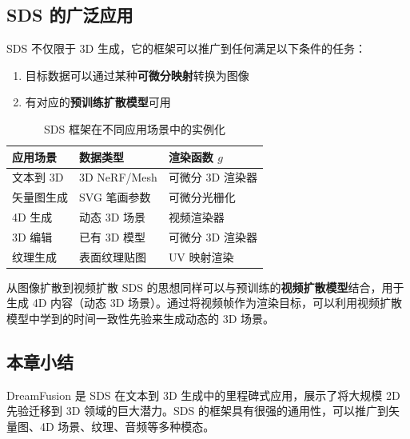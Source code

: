 \subsection{SDS 的广泛应用}

SDS 不仅限于 3D 生成，它的框架可以推广到任何满足以下条件的任务：
\begin{enumerate}
    \item 目标数据可以通过某种\textbf{可微分映射}转换为图像
    \item 有对应的\textbf{预训练扩散模型}可用
\end{enumerate}

\begin{table}[H]
\centering
\begin{tabular}{lll}
\toprule
\textbf{应用场景} & \textbf{数据类型} & \textbf{渲染函数 $g$} \\
\midrule
文本到 3D & 3D NeRF/Mesh & 可微分 3D 渲染器 \\
矢量图生成 & SVG 笔画参数 & 可微分光栅化 \\
4D 生成 & 动态 3D 场景 & 视频渲染器 \\
3D 编辑 & 已有 3D 模型 & 可微分 3D 渲染器 \\
纹理生成 & 表面纹理贴图 & UV 映射渲染 \\
\bottomrule
\end{tabular}
\caption{SDS 框架在不同应用场景中的实例化}
\end{table}

\begin{knowledgebox}{从图像扩散到视频扩散}
SDS 的思想同样可以与预训练的\textbf{视频扩散模型}结合，用于生成 4D 内容（动态 3D 场景）。通过将视频帧作为渲染目标，可以利用视频扩散模型中学到的时间一致性先验来生成动态的 3D 场景。
\end{knowledgebox}

\subsection{本章小结}

DreamFusion 是 SDS 在文本到 3D 生成中的里程碑式应用，展示了将大规模 2D 先验迁移到 3D 领域的巨大潜力。SDS 的框架具有很强的通用性，可以推广到矢量图、4D 场景、纹理、音频等多种模态。

\newpage
